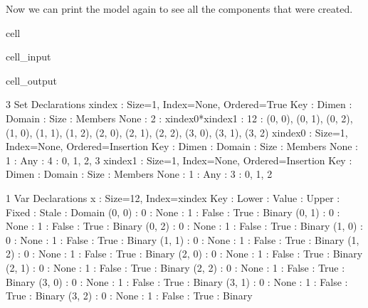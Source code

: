 \documentclass[letterpaper,10pt,english]{jupyterBook}
\begin{document}
\sphinxAtStartPar
Now we can print the model again to see all the components that were created.

\begin{sphinxuseclass}{cell}\begin{sphinxVerbatimInput}

\begin{sphinxuseclass}{cell_input}
\begin{sphinxVerbatim}[commandchars=\\\{\}]
\end{sphinxVerbatim}

\end{sphinxuseclass}\end{sphinxVerbatimInput}
\begin{sphinxVerbatimOutput}

\begin{sphinxuseclass}{cell_output}
\begin{sphinxVerbatim}[commandchars=\\\{\}]
3 Set Declarations
    x\PYGZus{}index : Size=1, Index=None, Ordered=True
        Key  : Dimen : Domain              : Size : Members
        None :     2 : x\PYGZus{}index\PYGZus{}0*x\PYGZus{}index\PYGZus{}1 :   12 : \PYGZob{}(0, 0), (0, 1), (0, 2), (1, 0), (1, 1), (1, 2), (2, 0), (2, 1), (2, 2), (3, 0), (3, 1), (3, 2)\PYGZcb{}
    x\PYGZus{}index\PYGZus{}0 : Size=1, Index=None, Ordered=Insertion
        Key  : Dimen : Domain : Size : Members
        None :     1 :    Any :    4 : \PYGZob{}0, 1, 2, 3\PYGZcb{}
    x\PYGZus{}index\PYGZus{}1 : Size=1, Index=None, Ordered=Insertion
        Key  : Dimen : Domain : Size : Members
        None :     1 :    Any :    3 : \PYGZob{}0, 1, 2\PYGZcb{}

1 Var Declarations
    x : Size=12, Index=x\PYGZus{}index
        Key    : Lower : Value : Upper : Fixed : Stale : Domain
        (0, 0) :     0 :  None :     1 : False :  True : Binary
        (0, 1) :     0 :  None :     1 : False :  True : Binary
        (0, 2) :     0 :  None :     1 : False :  True : Binary
        (1, 0) :     0 :  None :     1 : False :  True : Binary
        (1, 1) :     0 :  None :     1 : False :  True : Binary
        (1, 2) :     0 :  None :     1 : False :  True : Binary
        (2, 0) :     0 :  None :     1 : False :  True : Binary
        (2, 1) :     0 :  None :     1 : False :  True : Binary
        (2, 2) :     0 :  None :     1 : False :  True : Binary
        (3, 0) :     0 :  None :     1 : False :  True : Binary
        (3, 1) :     0 :  None :     1 : False :  True : Binary
        (3, 2) :     0 :  None :     1 : False :  True : Binary


\end{sphinxVerbatim}
\end{sphinxuseclass}
\end{sphinxVerbatimOutput}
\end{sphinxuseclass}
\end{document}
